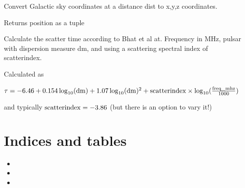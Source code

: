 \documentclass[letterpaper,10pt,english]{sphinxmanual}
\begin{document}

\begin{fulllineitems}
\label{\detokenize{module-level-docs:galacticops.lb_to_xyz}}
\pysigstartsignatures
\pysiglinewithargsret
{}
{\sphinxparamcomma {}\sphinxparamcomma {}}
{}
\pysigstopsignatures
\sphinxAtStartPar
Convert Galactic sky coordinates at a distance dist to x,y,z coordinates.

\sphinxAtStartPar
Returns position as a tuple

\end{fulllineitems}


\begin{fulllineitems}
\label{\detokenize{module-level-docs:galacticops.scatter_bhat}}
\pysigstartsignatures
\pysiglinewithargsret
{}
{\sphinxparamcomma {}\sphinxparamcomma {}}
{}
\pysigstopsignatures
\sphinxAtStartPar
Calculate the scatter time according to Bhat et al at. Frequency in MHz, pulsar with dispersion measure dm, and using a scattering spectral index of scatterindex.

\sphinxAtStartPar
Calculated as

\sphinxAtStartPar
\(\tau = -6.46 + 0.154 \log_{10}({\rm{dm}}) + 1.07\log_{10}({\rm{dm}})^2 + {\rm{scatterindex}} \times \log_{10}(\frac{\rm{freq\_mhz}}{1000})\)

\sphinxAtStartPar
and typically \({\rm{scatterindex}} = -3.86\) (but there is an option to vary it!)

\end{fulllineitems}



\chapter{Indices and tables}
\label{\detokenize{index:indices-and-tables}}\begin{itemize}
\item {} 
\sphinxAtStartPar
{}

\item {} 
\sphinxAtStartPar
{}

\item {} 
\sphinxAtStartPar
{}

\end{itemize}
\end{document}

